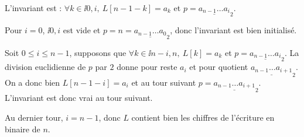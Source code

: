 \exer{}
\setcounter{numques}{0}

L'invariant est : \og $\forall k \in \ii{0,i},~ L[n-1-k] = a_{k}$ et $p = \underline{a_{n-1}\dots a_{i}}_2$\fg{}. 

Pour $i=0$, $\ii{0,i}$ est vide et $p = n =  \underline{a_{n-1}\dots a_{0}}_2$, donc l'invariant est bien initialisé. 

Soit $0 \leq i \leq n-1$, supposons que $\forall k \in \ii{n-i,n},~ L[k] = a_k$ et $p = \underline{a_{n-1}\dots a_{i}}_2$. 
La division euclidienne de $p$ par $2$ donne pour reste $a_{i}$ et pour quotient $\underline{a_{n-1}\dots a_{i+1}}_2$.
On a donc bien $L[n-1-i] = a_i$ et au tour suivant $p = \underline{a_{n-1}\dots a_{i+1}}_2$. L'invariant est donc vrai au tour suivant. 

Au dernier tour, $i = n-1$, donc $L$ contient bien les chiffres de l'écriture en binaire de $n$. 